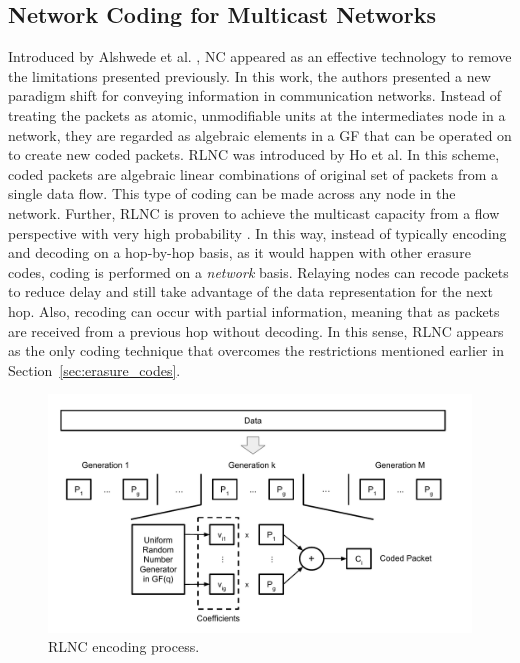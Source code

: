 \subsection{Network Coding for Multicast Networks}
\label{sec:rlnc}
Introduced by Alshwede et al. \cite{ahlswede2000network}, \ac{NC} appeared as an effective technology to remove the limitations presented previously. In this work, the authors presented a new paradigm shift for conveying information in communication networks. Instead of treating the packets as atomic, unmodifiable units at the intermediates node in a network, they are regarded as algebraic elements in a \ac{GF} that can be operated on to create new coded packets. \ac{RLNC} \cite{ho2006random} was introduced by Ho et al. In this scheme, coded packets are algebraic linear combinations of original set of packets from a single data flow. This type of coding can be made across any node in the network. Further, \ac{RLNC} is proven to achieve the multicast capacity from a flow perspective with very high probability \cite{koetter2003algebraic,ho2006random}. In this way, instead of typically encoding and decoding on a hop-by-hop basis, as it would happen with other erasure codes, coding is performed on a \textit{network} basis. Relaying nodes can recode packets to reduce delay and still take advantage of the data representation for the next hop. Also, recoding can occur with partial information, meaning that as packets are received from a previous hop without decoding. In this sense, \ac{RLNC} appears as the only coding technique that overcomes the restrictions mentioned earlier in Section~\ref{sec:erasure_codes}.

\begin{figure}[h]
  \centering
  \includegraphics[width=\textwidth]{introduction/figures/RLNC.pdf}
  \caption{RLNC encoding process.}
\label{fig:rlnc_enc}
\end{figure}


